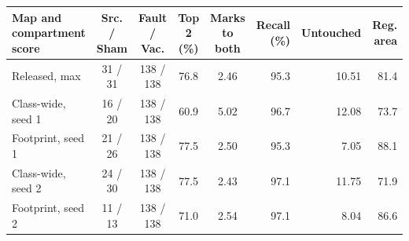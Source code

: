 \begin{tabular}{lccccrrr}
\toprule
Map and compartment score & Src. / Sham & Fault / Vac. & Top 2 (\%) & Marks to both & Recall (\%) & Untouched & Reg. area \\
\midrule
Released, max & 31 / 31 & 138 / 138 & 76.8 & 2.46 & 95.3 & 10.51 & 81.4 \\
\midrule
Class-wide, seed 1 & 16 / 20 & 138 / 138 & 60.9 & 5.02 & 96.7 & 12.08 & 73.7 \\
Footprint, seed 1 & 21 / 26 & 138 / 138 & 77.5 & 2.50 & 95.3 & 7.05 & 88.1 \\
\midrule
Class-wide, seed 2 & 24 / 30 & 138 / 138 & 77.5 & 2.43 & 97.1 & 11.75 & 71.9 \\
Footprint, seed 2 & 11 / 13 & 138 / 138 & 71.0 & 2.54 & 97.1 & 8.04 & 86.6 \\
\bottomrule
\end{tabular}
